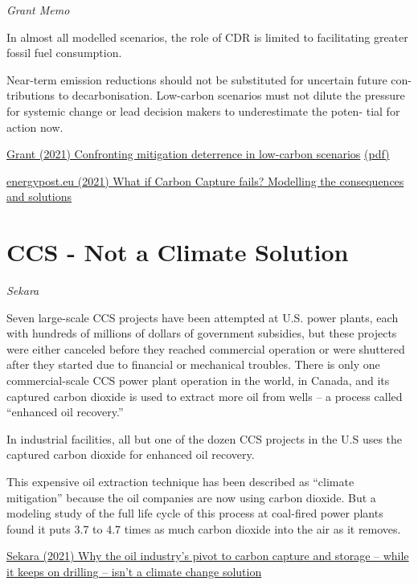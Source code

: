 \documentclass[
]{book}
\begin{document}
\emph{Grant Memo}

In almost all modelled scenarios, the role of CDR is
limited to facilitating greater fossil fuel consumption.

Near-term emission reductions
should not be substituted for uncertain future con-
tributions to decarbonisation. Low-carbon scenarios
must not dilute the pressure for systemic change or
lead decision makers to underestimate the poten-
tial for action now.

\href{https://iopscience.iop.org/article/10.1088/1748-9326/ac0749}{Grant (2021) Confronting mitigation deterrence in low-carbon scenarios}
\href{pdf/Grant_2021_Mitigation_Deterrence.pdf}{(pdf)}

\href{https://energypost.eu/what-if-carbon-capture-fails-modelling-the-consequences-and-solutions/}{energypost.eu (2021) What if Carbon Capture fails? Modelling the consequences and solutions}

\hypertarget{ccs---not-a-climate-solution}{%
\section{CCS - Not a Climate Solution}\label{ccs---not-a-climate-solution}}

\emph{Sekara}

Seven large-scale CCS projects have been attempted at U.S. power plants, each with hundreds of millions of dollars of government subsidies, but these projects were either canceled before they reached commercial operation or were shuttered after they started due to financial or mechanical troubles. There is only one commercial-scale CCS power plant operation in the world, in Canada, and its captured carbon dioxide is used to extract more oil from wells -- a process called ``enhanced oil recovery.''

In industrial facilities, all but one of the dozen CCS projects in the U.S uses the captured carbon dioxide for enhanced oil recovery.

This expensive oil extraction technique has been described as ``climate mitigation'' because the oil companies are now using carbon dioxide. But a modeling study of the full life cycle of this process at coal-fired power plants found it puts 3.7 to 4.7 times as much carbon dioxide into the air as it removes.

\href{https://theconversation.com/why-the-oil-industrys-pivot-to-carbon-capture-and-storage-while-it-keeps-on-drilling-isnt-a-climate-change-solution-171791}{Sekara (2021) Why the oil industry's pivot to carbon capture and storage -- while it keeps on drilling -- isn't a climate change solution}
\end{document}
